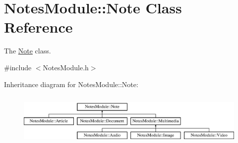 \hypertarget{class_notes_module_1_1_note}{\section{Notes\-Module\-:\-:Note Class Reference}
\label{class_notes_module_1_1_note}
}


The \hyperlink{class_notes_module_1_1_note}{Note} class.  




{\ttfamily \#include $<$Notes\-Module.\-h$>$}

Inheritance diagram for Notes\-Module\-:\-:Note\-:\begin{figure}[H]
\begin{center}
\leavevmode
\includegraphics[height=2.625000cm]{class_notes_module_1_1_note}
\end{center}
\end{figure}
